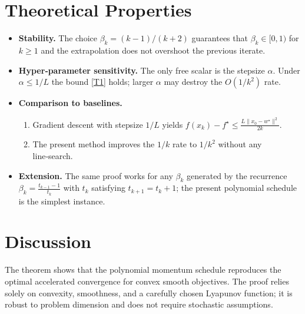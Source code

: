 \documentclass{article}
\begin{document}
\section*{Theoretical Properties}
\begin{itemize}[leftmargin=*]
\item \textbf{Stability.} The choice $\beta_k=(k-1)/(k+2)$ guarantees that $\beta_k\in[0,1)$ for $k\ge1$ and the extrapolation does not overshoot the previous iterate.
\item \textbf{Hyper‑parameter sensitivity.} The only free scalar is the stepsize $\alpha$. Under $\alpha\le 1/L$ the bound \eqref{T1} holds; larger $\alpha$ may destroy the $O(1/k^2)$ rate.
\item \textbf{Comparison to baselines.}
    \begin{enumerate}
        \item Gradient descent with stepsize $1/L$ yields $f(x_k)-f^\star\le \frac{L\|x_0-w^\star\|^2}{2k}$.
        \item The present method improves the $1/k$ rate to $1/k^2$ without any line‑search.
    \end{enumerate}
\item \textbf{Extension.} The same proof works for any $\beta_k$ generated by the recurrence
        $\beta_k=\frac{t_{k-1}-1}{t_k}$ with $t_k$ satisfying $t_{k+1}=t_k+1$; the present polynomial schedule is the simplest instance.
\end{itemize}

\section*{Discussion}
The theorem shows that the polynomial momentum schedule reproduces the optimal accelerated convergence for convex smooth objectives. The proof relies solely on convexity, smoothness, and a carefully chosen Lyapunov function; it is robust to problem dimension and does not require stochastic assumptions.
\end{document}
